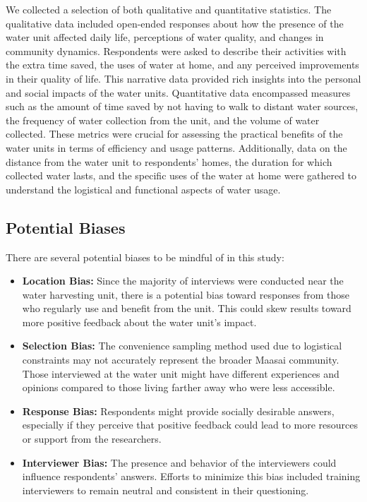\documentclass[10pt, twocolumn]{article}
\begin{document}
We collected a selection of both qualitative and quantitative statistics. The qualitative data included open-ended responses about how the presence of the water unit affected daily life, perceptions of water quality, and changes in community dynamics. Respondents were asked to describe their activities with the extra time saved, the uses of water at home, and any perceived improvements in their quality of life. This narrative data provided rich insights into the personal and social impacts of the water units.
Quantitative data encompassed measures such as the amount of time saved by not having to walk to distant water sources, the frequency of water collection from the unit, and the volume of water collected. These metrics were crucial for assessing the practical benefits of the water units in terms of efficiency and usage patterns. Additionally, data on the distance from the water unit to respondents' homes, the duration for which collected water lasts, and the specific uses of the water at home were gathered to understand the logistical and functional aspects of water usage.

\subsection{Potential Biases}

There are several potential biases to be mindful of in this study:

\begin{itemize}
    \item \textbf{Location Bias:} Since the majority of interviews were conducted near the water harvesting unit, there is a potential bias toward responses from those who regularly use and benefit from the unit. This could skew results toward more positive feedback about the water unit's impact.
    \item \textbf{Selection Bias:} The convenience sampling method used due to logistical constraints may not accurately represent the broader Maasai community. Those interviewed at the water unit might have different experiences and opinions compared to those living farther away who were less accessible.
    \item \textbf{Response Bias:} Respondents might provide socially desirable answers, especially if they perceive that positive feedback could lead to more resources or support from the researchers.
    \item \textbf{Interviewer Bias:} The presence and behavior of the interviewers could influence respondents' answers. Efforts to minimize this bias included training interviewers to remain neutral and consistent in their questioning.
\end{itemize}
\end{document}
